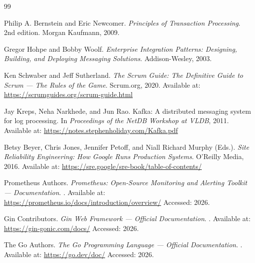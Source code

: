 
\begin{thebibliography}{99}

Philip A. Bernstein and Eric Newcomer.
\newblock \textit{Principles of Transaction Processing}.
\newblock 2nd edition. Morgan Kaufmann, 2009.

Gregor Hohpe and Bobby Woolf.
\newblock \textit{Enterprise Integration Patterns: Designing, Building, and
Deploying Messaging Solutions}.
\newblock Addison-Wesley, 2003.

Ken Schwaber and Jeff Sutherland.
\newblock \textit{The Scrum Guide: The Definitive Guide to Scrum --- The Rules
of the Game}.
\newblock Scrum.org, 2020.
\newblock Available at: \url{https://scrumguides.org/scrum-guide.html}

Jay Kreps, Neha Narkhede, and Jun Rao.
\newblock Kafka: A distributed messaging system for log processing.
\newblock In \textit{Proceedings of the NetDB Workshop at VLDB}, 2011.
\newblock Available at: \url{https://notes.stephenholiday.com/Kafka.pdf}

Betsy Beyer, Chris Jones, Jennifer Petoff, and Niall Richard Murphy (Eds.).
\newblock \textit{Site Reliability Engineering: How Google Runs Production
Systems}.
\newblock O'Reilly Media, 2016.
\newblock Available at: \url{https://sre.google/sre-book/table-of-contents/}

Prometheus Authors.
\newblock \textit{Prometheus: Open-Source Monitoring and Alerting Toolkit ---
Documentation}.
.
\newblock Available at: \url{https://prometheus.io/docs/introduction/overview/}
\newblock Accessed: 2026.

Gin Contributors.
\newblock \textit{Gin Web Framework --- Official Documentation}.
.
\newblock Available at: \url{https://gin-gonic.com/docs/}
\newblock Accessed: 2026.

The Go Authors.
\newblock \textit{The Go Programming Language --- Official Documentation}.
.
\newblock Available at: \url{https://go.dev/doc/}
\newblock Accessed: 2026.

\end{thebibliography}
